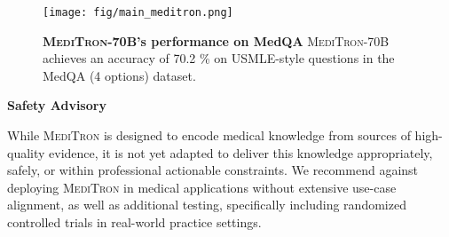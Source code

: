 \documentclass{article}
\newcommand{\llama}{\textnormal{Llama}}
\newcommand{\mtron}{\textsc{MediTron}\xspace}
\newcommand{\mtronb}{\textsc{MediTron-70B}\xspace}
\newcommand{\safetystatement}{While \mtron is designed to encode medical knowledge from sources of high-quality evidence, it is not yet adapted to deliver this knowledge appropriately, safely, or within professional actionable constraints. We recommend against deploying \mtron in medical applications without extensive use-case alignment, as well as additional testing, specifically including randomized controlled trials in real-world practice settings.}
\begin{document}
\begin{abstract}
Large language models (LLMs) can potentially democratize access to medical knowledge. While many efforts have been made to harness and improve LLMs' medical knowledge and reasoning capacities, the resulting models are either closed-source (e.g., PaLM, GPT-4) or limited in scale ( 13B parameters), which restricts their abilities.
In this work, we improve access to large-scale medical LLMs by releasing \mtron: a suite of open-source LLMs with 7B and 70B parameters adapted to the medical domain. \mtron builds on \llama-2 (through our adaptation of Nvidia's Megatron-LM distributed trainer), and extends pretraining on a comprehensively curated medical corpus, including selected PubMed articles, abstracts, and internationally-recognized medical guidelines.  
Evaluations using four major medical benchmarks show significant performance gains over several state-of-the-art baselines before and after task-specific finetuning. Overall, \mtron achieves a 6\% absolute performance gain over the best public baseline in its parameter class and 3\% over the strongest baseline we finetuned from \llama-2. Compared to closed-source LLMs, \mtronb outperforms GPT-3.5 and Med-PaLM and is within 5\% of  GPT-4 and 10\% of Med-PaLM-2. We release our code for curating the medical pretraining corpus and the \mtron model weights to drive open-source development of more capable medical LLMs.
\end{abstract}

\begin{figure}[h]
    \centering
    \texttt{[image: fig/main\_meditron.png]}
    \caption{\textbf{\mtronb's performance on MedQA} \mtronb achieves an accuracy of 70.2 \% on USMLE-style questions in the MedQA (4 options) dataset.}
    \label{fig:main-plot}
\end{figure}


\begin{center}
\begin{tcolorbox}[width=0.82\textwidth, colframe=white, arc=0pt, outer arc=0pt, toprule=0pt, bottomrule=0pt, leftrule=2pt, rightrule=2pt, square, sharp corners, text height=3cm]
\begin{center}\textbf{Safety Advisory}\\ \vspace{2mm}\end{center}
\safetystatement
\end{tcolorbox}
\end{center}
\end{document}

